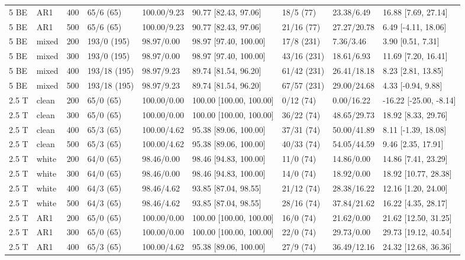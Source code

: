 \documentclass[10pt]{article}
\begin{document}
\begin{longtable}{@{}lllllllll@{}}
5 BE & AR1 & 400 & 65/6 (65) & 100.00/9.23 & 90.77 [82.43, 97.06] & 18/5 (77) & 23.38/6.49 & 16.88 [7.69, 27.14] \\
5 BE & AR1 & 500 & 65/6 (65) & 100.00/9.23 & 90.77 [82.43, 97.06] & 21/16 (77) & 27.27/20.78 & 6.49 [-4.11, 18.06] \\
5 BE & mixed & 200 & 193/0 (195) & 98.97/0.00 & 98.97 [97.40, 100.00] & 17/8 (231) & 7.36/3.46 & 3.90 [0.51, 7.31] \\
5 BE & mixed & 300 & 193/0 (195) & 98.97/0.00 & 98.97 [97.40, 100.00] & 43/16 (231) & 18.61/6.93 & 11.69 [7.20, 16.41] \\
5 BE & mixed & 400 & 193/18 (195) & 98.97/9.23 & 89.74 [81.54, 96.20] & 61/42 (231) & 26.41/18.18 & 8.23 [2.81, 13.85] \\
5 BE & mixed & 500 & 193/18 (195) & 98.97/9.23 & 89.74 [81.54, 96.20] & 67/57 (231) & 29.00/24.68 & 4.33 [-0.94, 9.88] \\
2.5 T & clean & 200 & 65/0 (65) & 100.00/0.00 & 100.00 [100.00, 100.00] & 0/12 (74) & 0.00/16.22 & -16.22 [-25.00, -8.14] \\
2.5 T & clean & 300 & 65/0 (65) & 100.00/0.00 & 100.00 [100.00, 100.00] & 36/22 (74) & 48.65/29.73 & 18.92 [8.33, 29.76] \\
2.5 T & clean & 400 & 65/3 (65) & 100.00/4.62 & 95.38 [89.06, 100.00] & 37/31 (74) & 50.00/41.89 & 8.11 [-1.39, 18.08] \\
2.5 T & clean & 500 & 65/3 (65) & 100.00/4.62 & 95.38 [89.06, 100.00] & 40/33 (74) & 54.05/44.59 & 9.46 [2.35, 17.91] \\
2.5 T & white & 200 & 64/0 (65) & 98.46/0.00 & 98.46 [94.83, 100.00] & 11/0 (74) & 14.86/0.00 & 14.86 [7.41, 23.29] \\
2.5 T & white & 300 & 64/0 (65) & 98.46/0.00 & 98.46 [94.83, 100.00] & 14/0 (74) & 18.92/0.00 & 18.92 [10.77, 28.38] \\
2.5 T & white & 400 & 64/3 (65) & 98.46/4.62 & 93.85 [87.04, 98.55] & 21/12 (74) & 28.38/16.22 & 12.16 [1.20, 24.00] \\
2.5 T & white & 500 & 64/3 (65) & 98.46/4.62 & 93.85 [87.04, 98.55] & 28/16 (74) & 37.84/21.62 & 16.22 [4.35, 28.17] \\
2.5 T & AR1 & 200 & 65/0 (65) & 100.00/0.00 & 100.00 [100.00, 100.00] & 16/0 (74) & 21.62/0.00 & 21.62 [12.50, 31.25] \\
2.5 T & AR1 & 300 & 65/0 (65) & 100.00/0.00 & 100.00 [100.00, 100.00] & 22/0 (74) & 29.73/0.00 & 29.73 [19.12, 40.54] \\
2.5 T & AR1 & 400 & 65/3 (65) & 100.00/4.62 & 95.38 [89.06, 100.00] & 27/9 (74) & 36.49/12.16 & 24.32 [12.68, 36.36] \\

\end{longtable}
\end{document}
